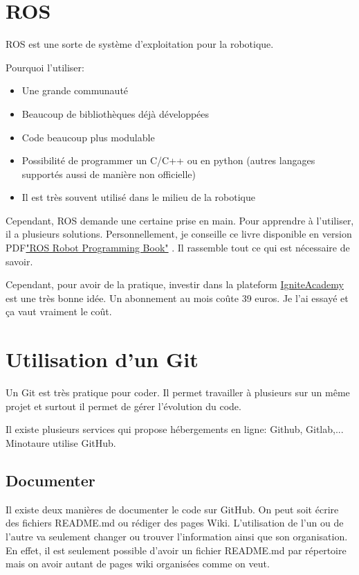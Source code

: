 \documentclass[a4paper, 11pt]{report}
\begin{document}
\chapter{ROS}

ROS est une sorte de système d'exploitation pour la robotique.

Pourquoi l'utiliser:
\begin{itemize}
\item Une grande communauté
\item Beaucoup de bibliothèques déjà développées
\item Code beaucoup plus modulable
\item Possibilité de programmer un C/C++ ou en python (autres langages supportés aussi de manière non officielle)
\item Il est très souvent utilisé dans le milieu de la robotique
\end{itemize}

Cependant, ROS demande une certaine prise en main. Pour apprendre à l'utiliser, il a plusieurs solutions. Personnellement, je conseille ce livre disponible en version PDF\href{https://community.robotsource.org/t/download-the-ros-robot-programming-book-for-free/51}{"ROS Robot Programming Book"} . Il rassemble tout ce qui est nécessaire de savoir.

Cependant, pour avoir de la pratique, investir dans la plateform \href{https://www.robotigniteacademy.com/en/}{IgniteAcademy} est une très bonne idée. Un abonnement au mois coûte 39 euros. Je l'ai essayé et ça vaut vraiment le coût.

\chapter{Utilisation d'un Git}
Un Git est très pratique pour coder. Il permet travailler à plusieurs sur un même projet et surtout il permet de gérer l'évolution du code.

Il existe plusieurs services qui propose hébergements en ligne: Github, Gitlab,... Minotaure utilise GitHub.

\section{Documenter}
Il existe deux manières de documenter le code sur GitHub. On peut soit écrire des fichiers README.md ou rédiger des pages Wiki. L'utilisation de l'un ou de l'autre va seulement changer ou trouver l'information ainsi que son organisation. En effet, il est seulement possible d'avoir un fichier README.md par répertoire mais on avoir autant de pages wiki organisées comme on veut.
\end{document}

